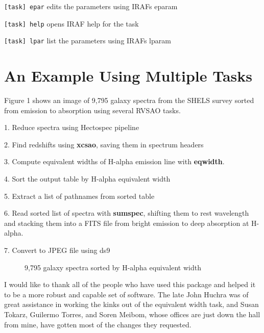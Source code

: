 \texttt{[task] epar} edits the parameters using IRAFs eparam

\texttt{[task] help} opens IRAF help for the task

\texttt{[task] lpar} list the parameters using IRAFs lparam

\section*{An Example Using Multiple Tasks}

Figure 1 shows an image of 9,795 galaxy spectra from the SHELS survey
\citep{shels_2005}
sorted from emission to absorption using several RVSAO tasks.

1.  Reduce spectra using Hectospec pipeline

2.  Find redshifts using \textbf{xcsao}, saving them in spectrum headers

3.  Compute equivalent widths of H-alpha emission line with \textbf{eqwidth}.

4. Sort the output table by H-alpha equivalent width

5. Extract a list of pathnames from sorted table

6. Read sorted list of spectra with \textbf{sumspec}, shifting them to rest wavelength and
stacking them into a FITS file from bright emission to deep absorption at H-alpha.

7. Convert to JPEG file using ds9

\begin{figure}[!ht]
\caption{9,795 galaxy spectra sorted by H-alpha equivalent width}
\end{figure}

\acknowledgements
I would like to thank all of the people who have used this package and helped
it to be a more robust and capable set of software.  The late John Huchra was of
great assistance in working the kinks out of the equivalent width task, and
Susan Tokarz, Guilermo Torres, and Soren Meibom, whose offices are just down
the hall from mine, have gotten most of the changes they requested.


